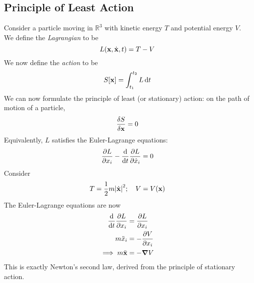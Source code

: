 \subsection{Principle of Least Action}
Consider a particle moving in \( \mathbb R^3 \) with kinetic energy \( T \) and potential energy \( V \).
We define the \textit{Lagrangian} to be
\[ L(\vb x, \dot {\vb x}, t) = T - V \]
We now define the \textit{action} to be
\[ S[\vb x] = \int_{t_1}^{t_2} L \dd{t} \]
We can now formulate the principle of least (or stationary) action: on the path of motion of a particle,
\[ \fdv{S}{\vb x} = 0 \]
Equivalently, \( L \) satisfies the Euler-Lagrange equations:
\[ \pdv{L}{x_i} - \dv{t}\pdv{L}{\dot x_i} = 0 \]
Consider
\[ T = \frac{1}{2}m\abs{\dot{\vb x}}^2;\quad V = V(\vb x) \]
The Euler-Lagrange equations are now
\begin{align*}
    \dv{t}\pdv{L}{x_i} &= \pdv{L}{x_i} \\
    m \ddot x_i &= -\pdv{V}{x_i} \\
    \implies m \ddot{\vb x} &= -\grad V
\end{align*}
This is exactly Newton's second law, derived from the principle of stationary action.
